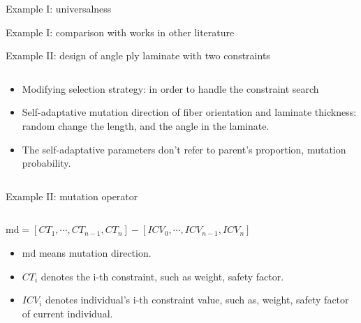 \documentclass{beamer}
\begin{document}
\begin{frame}{Example I: universalness}
	
\end{frame}


\begin{frame}{Example I: comparison with works in other literature}
	
\end{frame}


\begin{frame}{Example II: design of angle ply laminate with two constraints}
    \begin{columns}[c]
    \begin{column}{1\textwidth}
		\begin{itemize}
			\item Modifying selection strategy: in order to handle the constraint search
			\item Self-adaptative mutation direction of fiber orientation and laminate thickness:
				random change the length, and the angle in the laminate.
			\item The self-adaptative parameters don't refer to parent's proportion, mutation
				probability.
		\end{itemize}
    \end{column}
\end{columns}
\end{frame}


\begin{frame}{Example II: mutation operator}
    \begin{columns}[c]
    \begin{column}{1\textwidth}
		$\text{md} = [CT_1, \cdots, CT_{n-1}, CT_n] -  [ICV_0, \cdots, ICV_{n-1},
		ICV_n]$ \\
		\begin{itemize}
			\item  md means mutation direction.
			\item  $CT_i$ denotes the i-th constraint, such as weight, safety factor.
			\item  $ICV_i$ denotes individual's i-th constraint value, such as,  weight, safety
				factor of current individual.
		\end{itemize}

    \end{column}
\end{columns}
\end{frame}
\end{document}
